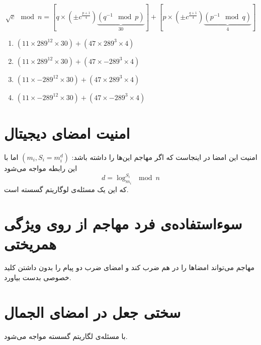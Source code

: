 \documentclass{article}
\begin{document}
\begin{latin}
\begin{equation*}
\sqrt{c} \mod n = \left[q\times(\pm c^{\frac{p+1}{4}})\underbrace{(q^{-1} \mod p)}_{30}\right] + \left[p\times(\pm c^{\frac{q+1}{4}})\underbrace{(p^{-1} \mod q)}_{4}\right]
\end{equation*}

\begin{enumerate}
\item $(11\times289^{12}\times30) + (47\times289^{3}\times4)$
\item $(11\times289^{12}\times30) + (47\times-289^{3}\times4)$
\item $(11\times-289^{12}\times30) + (47\times289^{3}\times4)$
\item $(11\times-289^{12}\times30) + (47\times-289^{3}\times4)$
\end{enumerate}
\end{latin}

\section{امنیت امضای دیجیتال }
امنیت این امضا در اینجاست که اگر مهاجم این‌ها را داشته باشد:
$(m_i, S_i = m^{d}_{i})$
اما با این رابطه مواجه می‌شود
\[
d = \log^{S_i}_{m_i} \mod n
\]
که این یک مسئله‌ی لوگاریتم گسسته است.

\section{سوء‌استفاده‌ی فرد مهاجم از روی ویژگی همریختی }
مهاجم می‌تواند امضاها را در هم ضرب کند و امضای ضرب دو پیام را بدون داشتن کلید خصوصی بدست بیاورد.

\section{سختی جعل در امضای الجمال}
با مسئله‌ی لگاریتم گسسته مواجه می‌شود.
\end{document}

